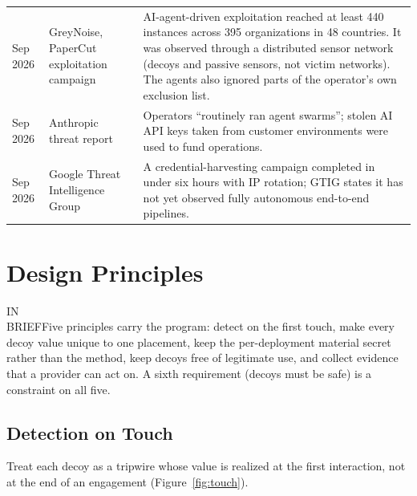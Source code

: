 \documentclass[11pt,letterpaper]{article}
\newcommand{\inbrief}[1]{\begin{inbriefbox}IN\\BRIEF\tcblower #1\end{inbriefbox}}
\begin{document}
{\begin{longtable}{L{1.6cm} L{3.3cm} L{10.85cm}}
Sep 2026 & GreyNoise, PaperCut exploitation campaign & AI-agent-driven exploitation reached at least 440 instances across 395 organizations in 48 countries. It was observed through a distributed sensor network (decoys and passive sensors, not victim networks). The agents also ignored parts of the operator's own exclusion list. \\
Sep 2026 & Anthropic threat report & Operators ``routinely ran agent swarms''; stolen AI API keys taken from customer environments were used to fund operations. \\
Sep 2026 & Google Threat Intelligence Group & A credential-harvesting campaign completed in under six hours with IP rotation; GTIG states it has not yet observed fully autonomous end-to-end pipelines. \\
\end{longtable}
}

\section{Design Principles}
\label{sec:principles}

\inbrief{Five principles carry the program: detect on the first touch, make every decoy value unique to one placement, keep the per-deployment material secret rather than the method, keep decoys free of legitimate use, and collect evidence that a provider can act on. A sixth requirement (decoys must be safe) is a constraint on all five.}

\subsection{Detection on Touch}
\label{sec:touch}

Treat each decoy as a tripwire whose value is realized at the first interaction, not at the end of an engagement (Figure~\ref{fig:touch}).
\end{document}
